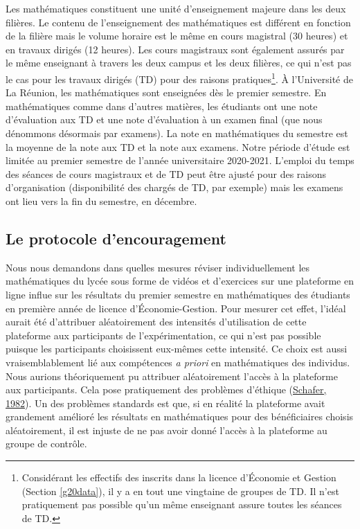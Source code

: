 \documentclass[
]{book}
\begin{document}
\quad Les mathématiques constituent une unité d'enseignement majeure dans les deux filières. Le contenu de l'enseignement des mathématiques est différent en fonction de la filière mais le volume horaire est le même en cours magistral (30 heures) et en travaux dirigés (12 heures). Les cours magistraux sont également assurés par le même enseignant à travers les deux campus et les deux filières, ce qui n'est pas le cas pour les travaux dirigés (TD) pour des raisons pratiques\footnote{Considérant les effectifs des inscrits dans la licence d'Économie et Gestion (Section \ref{g20data}), il y a en tout une vingtaine de groupes de TD. Il n'est pratiquement pas possible qu'un même enseignant assure toutes les séances de TD.}. À l'Université de La Réunion, les mathématiques sont enseignées dès le premier semestre. En mathématiques comme dans d'autres matières, les étudiants ont une note d'évaluation aux TD et une note d'évaluation à un examen final (que nous dénommons désormais par examens). La note en mathématiques du semestre est la moyenne de la note aux TD et la note aux examens. Notre période d'étude est limitée au premier semestre de l'année universitaire 2020-2021. L'emploi du temps des séances de cours magistraux et de TD peut être ajusté pour des raisons d'organisation (disponibilité des chargés de TD, par exemple) mais les examens ont lieu vers la fin du semestre, en décembre.

\hypertarget{g20instproto}{%
\subsection{Le protocole d'encouragement}\label{g20instproto}}

Nous nous demandons dans quelles mesures réviser individuellement les mathématiques du lycée sous forme de vidéos et d'exercices sur une plateforme en ligne influe sur les résultats du premier semestre en mathématiques des étudiants en première année de licence d'Économie-Gestion.
Pour mesurer cet effet, l'idéal aurait été d'attribuer aléatoirement des intensités d'utilisation de cette plateforme aux participants de l'expérimentation, ce qui n'est pas possible puisque les participants choisissent eux-mêmes cette intensité. Ce choix est aussi vraisemblablement lié aux compétences \emph{a priori} en mathématiques des individus. Nous aurions théoriquement pu attribuer aléatoirement l'accès à la plateforme aux participants. Cela pose pratiquement des problèmes d'éthique (\protect\hyperlink{ref-SHA:82}{Schafer, 1982}). Un des problèmes standards est que, si en réalité la plateforme avait grandement amélioré les résultats en mathématiques pour des bénéficiaires choisis aléatoirement, il est injuste de ne pas avoir donné l'accès à la plateforme au groupe de contrôle.
\end{document}
